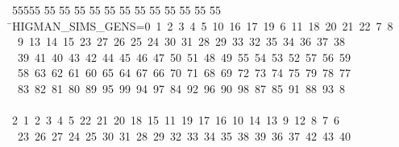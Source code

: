 %
%
\begin{tabbing}
55555 \= 55 \= 55 \= 55 \= 55 \= 55 \= 55 \= 55 \= 55 \= 55 \= 55 \= 55 \= 55 \= \>HIGMAN\_SIMS\_GENS=0\ 1\ 2\ 3\ 4\ 5\ 10\ 16\ 17\ 19\ 6\ 11\ 18\ 20\ 21\ 22\ 7\ 8\ \\[0pt]
\ 9\ 13\ 14\ 15\ 23\ 27\ 26\ 25\ 24\ 30\ 31\ 28\ 29\ 33\ 32\ 35\ 34\ 36\ 37\ 38\\[0pt]
\>\ 39\ 41\ 40\ 43\ 42\ 44\ 45\ 46\ 47\ 50\ 51\ 48\ 49\ 55\ 54\ 53\ 52\ 57\ 56\ 59\\[0pt]
\>\ 58\ 63\ 62\ 61\ 60\ 65\ 64\ 67\ 66\ 70\ 71\ 68\ 69\ 72\ 73\ 74\ 75\ 79\ 78\ 77\ \\[0pt]
\ 83\ 82\ 81\ 80\ 89\ 95\ 99\ 94\ 97\ 84\ 92\ 96\ 90\ 98\ 87\ 85\ 91\ 88\ 93\ 8\\[0pt]
\\[0pt]
2\ 1\ 2\ 3\ 4\ 5\ 22\ 21\ 20\ 18\ 15\ 11\ 19\ 17\ 16\ 10\ 14\ 13\ 9\ 12\ 8\ 7\ 6\\[0pt]
\>\ 23\ 26\ 27\ 24\ 25\ 30\ 31\ 28\ 29\ 32\ 33\ 34\ 35\ 38\ 39\ 36\ 37\ 42\ 43\ 40\ \\[0pt]

\end{tabbing}
